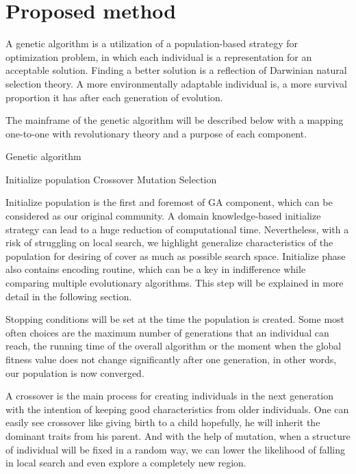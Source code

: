 \section{Proposed method}
A genetic algorithm is a utilization of a population-based strategy for optimization problem, in which each individual is a representation for an acceptable solution. Finding a better solution is a reflection of Darwinian natural selection theory. A more environmentally adaptable individual is, a more survival proportion it has after each generation of evolution.

The mainframe of the genetic algorithm will be described below with a mapping one-to-one with revolutionary theory and a purpose of each component.

\begin{algorithm}
\caption{Genetic algorithm}
\begin{algorithmic}[1]
\State Initialize population
	\State Crossover
	\State Mutation
	\State Selection
\EndWhile
\end{algorithmic}
\end{algorithm}

Initialize population is the first and foremost of GA component, which can be considered as our original community. A domain knowledge-based initialize strategy can lead to a huge reduction of computational time. Nevertheless, with a risk of struggling on local search, we highlight generalize characteristics of the population for desiring of cover as much as possible search space. Initialize phase also contains encoding routine, which can be a key in indifference while comparing multiple evolutionary algorithms. This step will be explained in more detail in the following section.

Stopping conditions will be set at the time the population is created. Some most often choices are the maximum number of generations that an individual can reach, the running time of the overall algorithm or the moment when the global fitness value does not change significantly after one generation, in other words, our population is now converged.

A crossover is the main process for creating individuals in the next generation with the intention of keeping good characteristics from older individuals. One can easily see crossover like giving birth to a child hopefully, he will inherit the dominant traits from his parent. And with the help of mutation, when a structure of individual will be fixed in a random way, we can lower the likelihood of falling in local search and even explore a completely new region.

